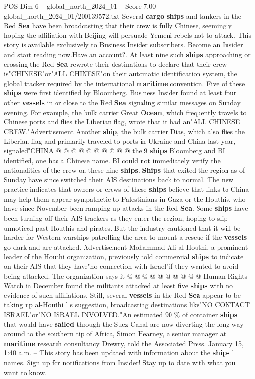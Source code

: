 \begin{textsample}{POS Dim 6 – global\_north\_2024\_01 – Score 7.00 – global\_north\_2024\_01/200139572.txt}  \label{ex:f6_pos_115}
Several \textbf{cargo} \textbf{ships} and tankers in the Red \textbf{Sea} have been broadcasting that their crew is fully Chinese, seemingly hoping the affiliation with Beijing will persuade Yemeni rebels not to attack.
This story is available exclusively to Business Insider subscribers.
Become an Insider and start reading now.Have an account?.
At least nine such \textbf{ships} approaching or crossing the Red \textbf{Sea} rewrote their destinations to declare that their crew is"CHINESE"or"ALL CHINESE"on their automatic identification system, the global tracker required by the international \textbf{maritime} convention.
Five of these \textbf{ships} were first identified by Bloomberg.
Business Insider found at least four other \textbf{vessels} in or close to the Red \textbf{Sea} signaling similar messages on Sunday evening.
For example, the bulk carrier Great \textbf{Ocean}, which frequently travels to Chinese ports and flies the Liberian flag, wrote that it had an"ALL CHINESE CREW."Advertisement Another \textbf{ship}, the bulk carrier Dias, which also flies the Liberian flag and primarily traveled to ports in Ukraine and China last year, signaled"CHINA @ @ @ @ @ @ @ @ @ @ the 9 \textbf{ships} Bloomberg and BI identified, one has a Chinese name.
BI could not immediately verify the nationalities of the crew on these nine \textbf{ships}. \textbf{Ships} that exited the region as of Sunday have since switched their AIS destinations back to normal.
The new practice indicates that owners or crews of these \textbf{ships} believe that links to China may help them appear sympathetic to Palestinians in Gaza or the Houthis, who have since November been ramping up attacks in the Red \textbf{Sea}.
Some \textbf{ships} have been turning off their AIS trackers as they enter the region, hoping to slip unnoticed past Houthis and pirates.
But the industry cautioned that it will be harder for Western warships patrolling the area to mount a rescue if the \textbf{vessels} go dark and are attacked.
Advertisement Mohammad Ali al-Houthi, a prominent leader of the Houthi organization, previously told commercial \textbf{ships} to indicate on their AIS that they have"no connection with Israel"if they wanted to avoid being attacked.
The organization says it @ @ @ @ @ @ @ @ @ @ Human Rights Watch in December found the militants attacked at least five \textbf{ships} with no evidence of such affiliations.
Still, several \textbf{vessels} in the Red \textbf{Sea} appear to be taking up al-Houthi ' s suggestion, broadcasting destinations like"NO CONTACT ISRAEL"or"NO ISRAEL INVOLVED."An estimated 90 \% of container \textbf{ships} that would have \textbf{sailed} through the Suez Canal are now diverting the long way around to the southern tip of Africa, Simon Hearney, a senior manager at \textbf{maritime} research consultancy Drewry, told the Associated Press.
January 15, 1:40 a.m. -- This story has been updated with information about the \textbf{ships} ' names.
Sign up for notifications from Insider!
Stay up to date with what you want to know.

\end{textsample}
